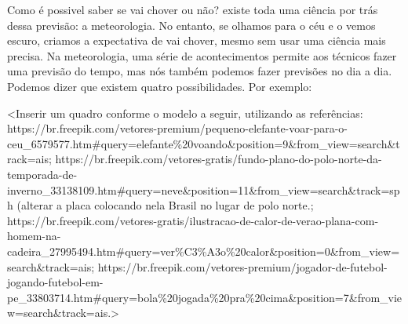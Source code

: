 Como é possivel saber se vai chover ou não? existe toda uma ciência por trás dessa previsão: a meteorologia.
No entanto, se olhamos para o céu e o vemos escuro, criamos a expectativa de vai chover, mesmo sem usar uma ciência mais precisa. Na meteorologia, uma série de acontecimentos
permite aos técnicos fazer uma previsão do tempo, mas nós também podemos fazer previsões no dia a dia. Podemos dizer que existem quatro possibilidades. Por exemplo:

\textless{}Inserir um quadro conforme o modelo a seguir, utilizando as
referências:
https://br.freepik.com/vetores-premium/pequeno-elefante-voar-para-o-ceu\_6579577.htm\#query=elefante\%20voando\&position=9\&from\_view=search\&track=ais;
https://br.freepik.com/vetores-gratis/fundo-plano-do-polo-norte-da-temporada-de-inverno\_33138109.htm\#query=neve\&position=11\&from\_view=search\&track=sph
(alterar a placa colocando nela Brasil no lugar de polo norte.;
https://br.freepik.com/vetores-gratis/ilustracao-de-calor-de-verao-plana-com-homem-na-cadeira\_27995494.htm\#query=ver\%C3\%A3o\%20calor\&position=0\&from\_view=search\&track=ais;
https://br.freepik.com/vetores-premium/jogador-de-futebol-jogando-futebol-em-pe\_33803714.htm\#query=bola\%20jogada\%20pra\%20cima\&position=7\&from\_view=search\&track=ais.\textgreater{}

